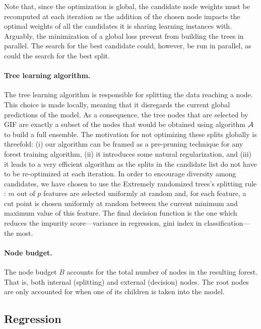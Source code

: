\documentclass{article}
\begin{document}
Note that, since the optimization is global, the  candidate node weights
must be recomputed at each iteration as the addition of the chosen node impacts 
the optimal weights of all the candidates it is sharing learning instances with.
Arguably, the minimization of a global loss prevent from building the trees in 
parallel. The search for the best candidate could, however, be run in parallel, 
as could the search for the best split. 

\paragraph{Tree learning algorithm.}
The tree learning algorithm is responsible for splitting the data
reaching a node. This choice is made locally, meaning that it
disregards the current global predictions of the model. As a
consequence, the tree nodes that are selected by GIF are exactly a
subset of the nodes that would be obtained using algorithm ${\cal A}$
to build a full ensemble. The motivation for not optimizing these
splits globally is threefold: (i) our algorithm can be framed as a
pre-pruning technique for any forest training algorithm, (ii) it
introduces some natural regularization, and (iii) it leads to a very
efficient algorithm as the splits in the candidate list do not have to
be re-optimized at each iteration. In order to encourage diversity
among candidates, we have chosen to use the Extremely randomized
trees's splitting rule \cite{extratrees}: $m$ out of $p$ features are
selected uniformly at random and, for each feature, a cut point is
chosen uniformly at random between the current minimum and maximum
value of this feature. The final decision function is the one which
reduces the impurity score---variance in regression, gini index in
classification---the most.

\paragraph{Node budget.}
The node budget $B$ accounts for the total number of nodes in the resulting 
forest. That is, both internal (splitting) and external (decision) nodes. The 
root nodes are only accounted for when one of its children is taken into the 
model.


\subsection{Regression}
\label{subsec:regression}
\end{document}
